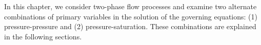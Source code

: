 
In this chapter, we consider two-phase flow processes and examine two alternate combinations of primary variables in the solution of the governing equations: (1) pressure-pressure and (2) pressure-saturation. These combinations are explained in the following sections.




